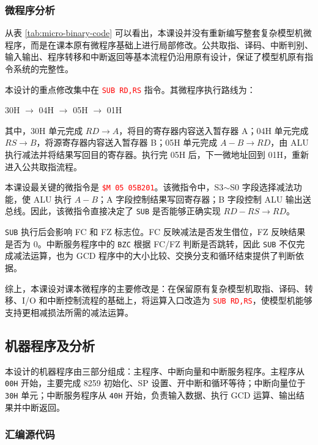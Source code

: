 \documentclass[UTF8,12pt,a4paper]{ctexart}
\newcommand{\hex}[1]{\texttt{#1H}}
\newcommand{\inst}[1]{\texttt{#1}}
\newcommand{\micro}[1]{\texttt{\$M #1}}
\begin{document}
\subsubsection{微程序分析}

从表 \ref{tab:micro-binary-code} 可以看出，本课设并没有重新编写整套复杂模型机微程序，而是在课本原有微程序基础上进行局部修改。公共取指、译码、中断判别、输入输出、程序转移和中断返回等基本流程仍沿用原有设计，保证了模型机原有指令系统的完整性。

本设计的重点修改集中在 \textcolor{red}{\inst{SUB RD,RS}} 指令。其微程序执行路线为：

\begin{center}
30H $\rightarrow$ 04H $\rightarrow$ 05H $\rightarrow$ 01H
\end{center}

其中，30H 单元完成 $RD\rightarrow A$，将目的寄存器内容送入暂存器 A；04H 单元完成 $RS\rightarrow B$，将源寄存器内容送入暂存器 B；05H 单元完成 $A-B\rightarrow RD$，由 ALU 执行减法并将结果写回目的寄存器。执行完 05H 后，下一微地址回到 01H，重新进入公共取指流程。

本课设最关键的微指令是 \textcolor{red}{\micro{05 05B201}}。该微指令中，S3$\sim$S0 字段选择减法功能，使 ALU 执行 $A-B$；A 字段控制结果写回寄存器；B 字段控制 ALU 输出送总线。因此，该微指令直接决定了 \inst{SUB} 是否能够正确实现 $RD-RS\rightarrow RD$。

\inst{SUB} 执行后会影响 FC 和 FZ 标志位。FC 反映减法是否发生借位，FZ 反映结果是否为 0。中断服务程序中的 \inst{BZC} 根据 FC/FZ 判断是否跳转，因此 \inst{SUB} 不仅完成减法运算，也为 GCD 程序中的大小比较、交换分支和循环结束提供了判断依据。

综上，本课设对课本微程序的主要修改是：在保留原有复杂模型机取指、译码、转移、I/O 和中断控制流程的基础上，将运算入口改造为 \textcolor{red}{\inst{SUB RD,RS}}，使模型机能够支持更相减损法所需的减法运算。


\subsection{机器程序及分析}

本设计的机器程序由三部分组成：主程序、中断向量和中断服务程序。主程序从 \hex{00} 开始，主要完成 8259 初始化、SP 设置、开中断和循环等待；中断向量位于 \hex{30} 单元；中断服务程序从 \hex{40} 开始，负责输入数据、执行 GCD 运算、输出结果并中断返回。

\subsubsection{汇编源代码}
\end{document}
